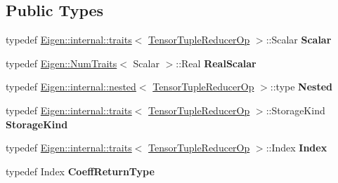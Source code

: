 \subsection*{Public Types}
\begin{DoxyCompactItemize}
\item 
\mbox{\label{class_eigen_1_1_tensor_tuple_reducer_op_aa9177073b5b64bfc7b6b9ff1ff773f19}} 
typedef \hyperlink{struct_eigen_1_1internal_1_1traits}{Eigen\+::internal\+::traits}$<$ \hyperlink{class_eigen_1_1_tensor_tuple_reducer_op}{Tensor\+Tuple\+Reducer\+Op} $>$\+::Scalar {\bfseries Scalar}
\item 
\mbox{\label{class_eigen_1_1_tensor_tuple_reducer_op_afd4032323bbc353effde4d597f805743}} 
typedef \hyperlink{group___core___module_struct_eigen_1_1_num_traits}{Eigen\+::\+Num\+Traits}$<$ Scalar $>$\+::Real {\bfseries Real\+Scalar}
\item 
\mbox{\label{class_eigen_1_1_tensor_tuple_reducer_op_a0ce79b4f18fe2554cb5548d0b30f4008}} 
typedef \hyperlink{struct_eigen_1_1internal_1_1nested}{Eigen\+::internal\+::nested}$<$ \hyperlink{class_eigen_1_1_tensor_tuple_reducer_op}{Tensor\+Tuple\+Reducer\+Op} $>$\+::type {\bfseries Nested}
\item 
\mbox{\label{class_eigen_1_1_tensor_tuple_reducer_op_a8f88940b5898191b7622dfaaab035cde}} 
typedef \hyperlink{struct_eigen_1_1internal_1_1traits}{Eigen\+::internal\+::traits}$<$ \hyperlink{class_eigen_1_1_tensor_tuple_reducer_op}{Tensor\+Tuple\+Reducer\+Op} $>$\+::Storage\+Kind {\bfseries Storage\+Kind}
\item 
\mbox{\label{class_eigen_1_1_tensor_tuple_reducer_op_ae3cee19dcb6704c32981737d0eec926e}} 
typedef \hyperlink{struct_eigen_1_1internal_1_1traits}{Eigen\+::internal\+::traits}$<$ \hyperlink{class_eigen_1_1_tensor_tuple_reducer_op}{Tensor\+Tuple\+Reducer\+Op} $>$\+::Index {\bfseries Index}
\item 
\mbox{\label{class_eigen_1_1_tensor_tuple_reducer_op_a65b018a64cbe9957152e1d6536faef49}} 
typedef Index {\bfseries Coeff\+Return\+Type}
\item 

\end{DoxyCompactItemize}
